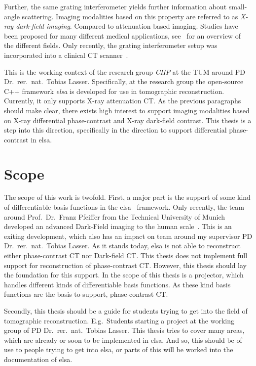 Further, the same grating interferometer yields further information about small-angle scattering.
Imaging modalities based on this property are referred to as \textit{X-ray dark-field imaging}.
Compared to attenuation based imaging. Studies have been proposed for many different medical
applications, see~\cite[chap. 1.3.1]{wieczorek_anisotropic_2017} for an overview of the different
fields. Only recently, the grating interferometer setup was incorporated into a clinical CT
scanner~\cite{viermetz_dark-field_2022}.

This is the working context of the research group \textit{\gls{CIIP}} at the \gls{TUM} around PD
Dr.\ rer.\ nat.\ Tobias Lasser. Specifically, at the research group the open-source C++ framework
\textit{elsa} is developed for use in tomographic reconstruction. Currently, it only supports X-ray
attenuation CT\@. As the previous paragraphs should make clear, there exists high interest to
support imaging modalities based on X-ray differential phase-contrast and X-ray dark-field contrast.
This thesis is a step into this direction, specifically in the direction to support differential
phase-contrast in elsa.

\section{Scope}\label{chap:scope}


The scope of this work is twofold. First, a major part is the support of some kind of differentiable
basis functions in the elsa~\cite{lasser_elsa_2019} framework. Only recently, the team
around Prof.\ Dr.\ Franz Pfeiffer from the Technical University of Munich developed an advanced
Dark-Field imaging to the human scale~\cite{viermetz_dark-field_2022}. This is an exiting
development, which also has an impact on team around my supervisor PD Dr.\ rer.\ nat.\ Tobias
Lasser. As it stands today, elsa is not able to reconstruct either phase-contrast CT nor Dark-field
CT\@. This thesis does not implement full support for reconstruction of phase-contrast CT\@.
However, this thesis should lay the foundation for this support. In the scope of this thesis is a
projector, which handles different kinds of differentiable basis functions. As these kind basis
functions are the basis to support, phase-contrast CT\@.

Secondly, this thesis should be a guide for students trying to get into the field of tomographic
reconstruction. E.g.\ Students starting a project at the working group of PD Dr.\ rer.\ nat.\ Tobias
Lasser. This thesis tries to cover many areas, which are already or soon to be implemented in elsa.
And so, this should be of use to people trying to get into elsa, or parts of this will be worked
into the documentation of elsa.

